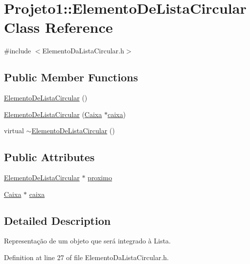 \hypertarget{classProjeto1_1_1ElementoDeListaCircular}{
\section{Projeto1::ElementoDeListaCircular Class Reference}
\label{classProjeto1_1_1ElementoDeListaCircular}
}


{\ttfamily \#include $<$ElementoDaListaCircular.h$>$}

\subsection*{Public Member Functions}
\begin{DoxyCompactItemize}
\item 
\hyperlink{classProjeto1_1_1ElementoDeListaCircular_ae9e0ccf0ea897a0d4b45368f7d02e4ce}{ElementoDeListaCircular} ()
\item 
\hyperlink{classProjeto1_1_1ElementoDeListaCircular_a25516bba2a32834a346ccb08a9b40cc2}{ElementoDeListaCircular} (\hyperlink{classProjeto1_1_1Caixa}{Caixa} $\ast$\hyperlink{classProjeto1_1_1ElementoDeListaCircular_a814668b406a3835016a372b5069bb822}{caixa})
\item 
virtual \hyperlink{classProjeto1_1_1ElementoDeListaCircular_a659b6674090be47acb2be96bcecd65ce}{$\sim$ElementoDeListaCircular} ()
\end{DoxyCompactItemize}
\subsection*{Public Attributes}
\begin{DoxyCompactItemize}
\item 
\hyperlink{classProjeto1_1_1ElementoDeListaCircular}{ElementoDeListaCircular} $\ast$ \hyperlink{classProjeto1_1_1ElementoDeListaCircular_a65b5ca20f12c1436d2ffa96421be919b}{proximo}
\item 
\hyperlink{classProjeto1_1_1Caixa}{Caixa} $\ast$ \hyperlink{classProjeto1_1_1ElementoDeListaCircular_a814668b406a3835016a372b5069bb822}{caixa}
\end{DoxyCompactItemize}


\subsection{Detailed Description}
Representação de um objeto que será integrado à Lista. 

Definition at line 27 of file ElementoDaListaCircular.h.



